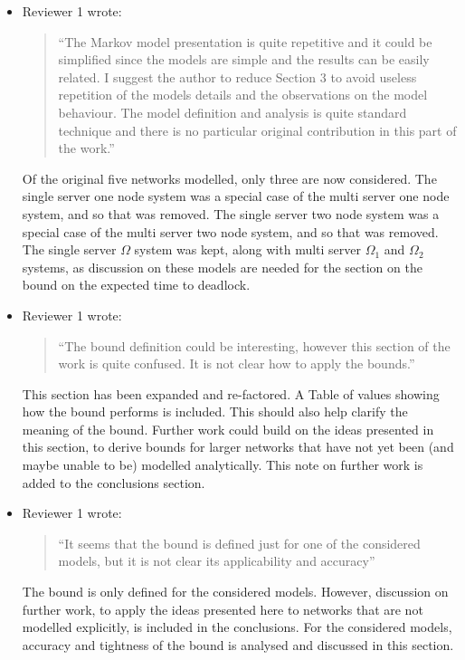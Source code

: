 \documentclass{article}
\begin{document}
\begin{itemize}

\item Reviewer 1 wrote:
\begin{quote}
``The Markov model presentation is quite repetitive and it could be simplified
since the models are simple and the results can be easily related.
I suggest the author to reduce Section 3 to avoid useless repetition of the
models details and the observations on the model behaviour.
The model definition and analysis is quite standard technique and there is no
particular original contribution in this part of the work.''
\end{quote}
Of the original five networks modelled, only three are now considered.
The single server one node system was a special case of the multi server one
node system, and so that was removed.
The single server two node system was a special case of the multi server two
node system, and so that was removed.
The single server $\Omega$ system was kept, along with multi server $\Omega_1$
and $\Omega_2$ systems, as discussion on these models are needed for the
section on the bound on the expected time to deadlock.


\item Reviewer 1 wrote:
\begin{quote}
``The bound definition could be interesting, however this section of the work
is quite confused.
It is not clear how to apply the bounds.''
\end{quote}
This section has been expanded and re-factored.
A Table of values showing how the bound performs is included.
This should also help clarify the meaning of the bound.
Further work could build on the ideas presented in this section, to derive
bounds for larger networks that have not yet been (and maybe unable to be)
modelled analytically.
This note on further work is added to the conclusions section.


\item Reviewer 1 wrote:
\begin{quote}
``It seems that the bound is defined just for one of the considered models,
but it is not clear its applicability and accuracy''
\end{quote}
The bound is only defined for the considered models.
However, discussion on further work, to apply the ideas presented here to
networks that are not modelled explicitly, is included in the conclusions.
For the considered models, accuracy and tightness of the bound is analysed and
discussed in this section.


\end{itemize}
\end{document}
